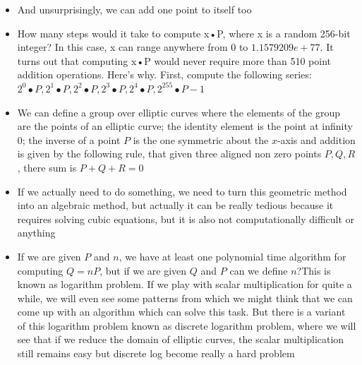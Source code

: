 \documentclass[12pt,letterpaper]{article}
\begin{document}
\begin{itemize}
    \item  And unsurprisingly, we can add one point to itself too \item How many steps would it take to compute x•P, where x is a random 256-bit integer? In this case, x can range anywhere from 0 to $1.1579209e+77$.
    It turns out that computing x•P would never require more than 510 point addition operations. Here’s why. First, compute the following series:
    $2^0•P, 2^1•P, 2^2•P, 2^3•P, 2^4•P, 2^{255}•P-1$
    \item We can define a group over elliptic curves where the elements of the group are the points of an elliptic curve;
    the identity element is the point at infinity 0;
    the inverse of a point $P$ is the one symmetric about the $x$-axis and addition is given by the following rule, that given three aligned non zero points $P,Q,R$, there sum is $P+Q+R=0$
    \item If we actually need to do something, we need to turn this geometric method into an algebraic method, but actually it can be really tedious because it requires solving cubic equations, but it is also not computationally difficult or anything
    \item If we are given $P$ and $n$, we have at least one polynomial time algorithm for computing $Q=nP$, but if we are given $Q$ and $P$ can we define $n$?This is known as logarithm problem. If we play with scalar multiplication for quite a while, we will even see some patterns from which we might think that we can come up with an algorithm which can solve this task. But there is a variant of this logarithm problem known as discrete logarithm problem, where we will see that if we reduce the domain of elliptic curves, the scalar multiplication still remains easy but discrete log become really a hard problem
\end{itemize}
\end{document}
